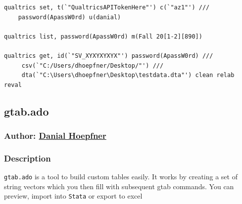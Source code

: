 {\begin{enumerate}
\end{enumerate}

\begin{lstlisting}
qualtrics set, t(`"QualtricsAPITokenHere"') c(`"az1"') ///
	password(ApassW0rd) u(danial)

qualtrics list, password(ApassW0rd) m(Fall 20[1-2][890])

qualtrics get, id(`"SV_XYXYXYXYX"') password(ApassW0rd) ///
     csv(`"C:/Users/dhoepfner/Desktop/"') ///
     dta(`"C:\Users\dhoepfner\Desktop\testdata.dta"') clean relab reval

\end{lstlisting}

\subsection{gtab.ado}
\subsubsection{Author: \href{mailto:dhoepfner@gibsonconsult.com}{Danial Hoepfner}}
\subsubsection{Description}
\texttt{gtab.ado} is a tool to build custom tables easily. It works by creating a set of string vectors which you then fill with subsequent gtab commands. You can preview, import into \texttt{Stata} or export to excel
}
